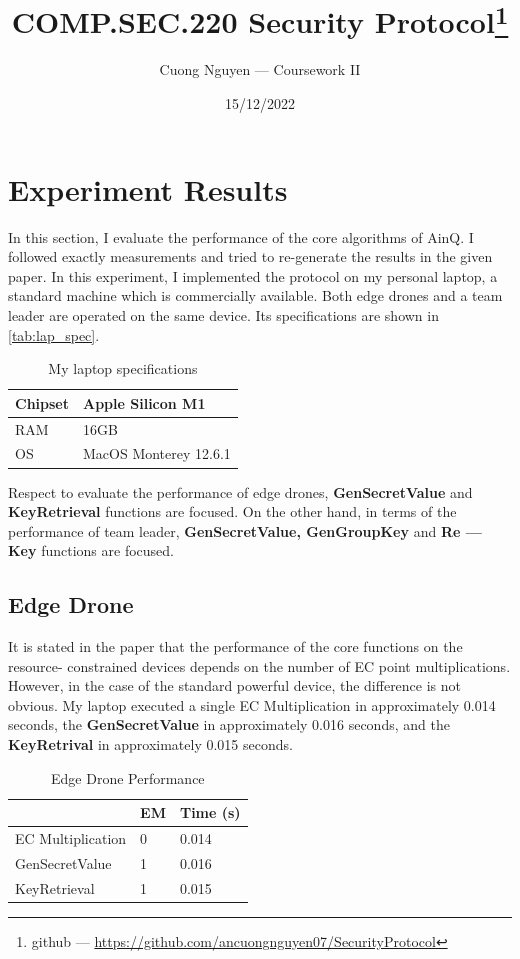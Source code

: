 \documentclass{article}
\title{COMP.SEC.220 Security Protocol\footnote{github --- \url{https://github.com/ancuongnguyen07/SecurityProtocol}}}
\author{Cuong Nguyen --- Coursework II}
\date{15/12/2022}
\begin{document}
    
\maketitle

\section{Experiment Results}
%
In this section, I evaluate the performance of the core algorithms of AinQ. I followed
exactly measurements and tried to re-generate the results in the given paper\cite{ainQ}.
In this experiment, I implemented the protocol on my personal laptop, a standard
machine which is commercially available. Both edge drones and a team leader
are operated on the same device.
Its specifications are shown in \autoref{tab:lap_spec}.

\begin{table}
    \centering
    \begin{tabular}{|l|l|}
        \hline
        Chipset & Apple Silicon M1 \\ \hline
        RAM & 16GB \\ \hline
        OS & MacOS Monterey 12.6.1 \\ \hline
    \end{tabular}
    \caption{My laptop specifications}\label{tab:lap_spec}
\end{table}

Respect to evaluate the performance of edge drones, \textbf{GenSecretValue} and
\textbf{KeyRetrieval} functions are focused. On the other hand, in terms of the performance
of team leader, \textbf{GenSecretValue, GenGroupKey} and \textbf{Re --- Key} functions
are focused.

\subsection{Edge Drone}
%
It is stated in the paper that the performance of the core functions on the resource-
constrained devices depends on the number of EC point multiplications\cite{ainQ}.
However, in the case of the standard powerful device, the difference is not obvious.
My laptop executed a single EC Multiplication in approximately 0.014 seconds, the
\textbf{GenSecretValue} in approximately 0.016 seconds, and the \textbf{KeyRetrival}
in approximately 0.015 seconds.

\begin{table}
    \centering
    \begin{tabular}{|l|l|l|}
        \hline
         & EM & Time (s) \\ \hline
        EC Multiplication & 0 & 0.014 \\ \hline
        GenSecretValue & 1 & 0.016 \\ \hline
        KeyRetrieval & 1 & 0.015 \\ \hline
    \end{tabular}
    \caption{Edge Drone Performance}\label{tab:edge_drone}
\end{table}
\end{document}
